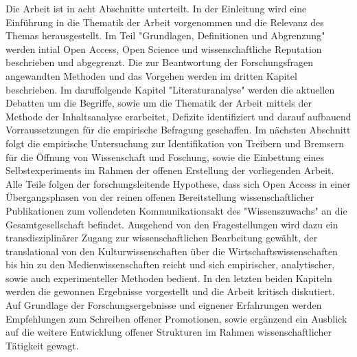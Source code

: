 Die Arbeit ist in acht Abschnitte unterteilt. In der Einleitung wird eine Einführung in die Thematik der Arbeit vorgenommen und die Relevanz des Themas herausgestellt. Im Teil "Grundlagen, Definitionen und Abgrenzung" werden intial Open Access, Open Science und wissenschaftliche Reputation beschrieben und abgegrenzt. Die zur Beantwortung der Forschungsfragen angewandten Methoden und das Vorgehen werden im dritten Kapitel beschrieben. Im daruffolgende Kapitel "Literaturanalyse" werden die aktuellen Debatten um die Begriffe, sowie um die Thematik der Arbeit mittels der Methode der Inhaltsanalyse erarbeitet, Defizite identifiziert und darauf aufbauend Vorraussetzungen für die empirische Befragung geschaffen. Im nächsten Abschnitt folgt die empirische Untersuchung zur Identifikation von Treibern und Bremsern für die Öffnung von Wissenschaft und Foschung, sowie die Einbettung eines Selbstexperiments im Rahmen der offenen Erstellung der vorliegenden Arbeit. Alle Teile folgen der forschungsleitende Hypothese, dass sich Open Access in einer Übergangsphasen von der reinen offenen Bereitstellung wissenschaftlicher Publikationen zum vollendeten Kommunikationsakt des "Wissenszuwachs" \cite{Luhmann1998} an die Gesamtgesellschaft befindet. Ausgehend von den Fragestellungen wird dazu ein transdisziplinärer Zugang zur wissenschaftlichen Bearbeitung gewählt, der translational von den Kulturwissenschaften über die Wirtschaftswissenschaften bis hin zu den Medienwissenschaften reicht und sich empirischer, analytischer, sowie auch experimenteller Methoden bedient. In den letzten beiden Kapiteln werden die gewonnen Ergebnisse vorgestellt und die Arbeit kritisch diskutiert. Auf Grundlage der Forschungsergebnisse und eignener Erfahrungen werden Empfehlungen zum Schreiben offener Promotionen, sowie ergänzend ein Ausblick auf die weitere Entwicklung offener Strukturen im Rahmen wissenschaftlicher Tätigkeit gewagt.

